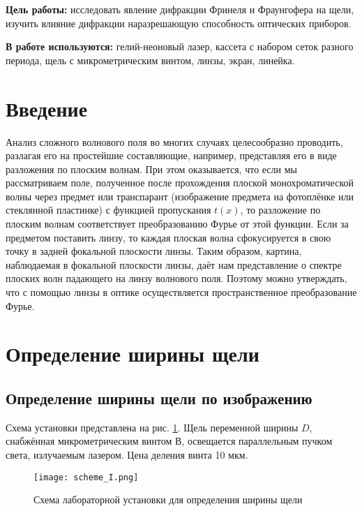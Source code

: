 


    

    \textbf{Цель работы:} исследовать явление дифракции Фринеля и Фраунгофера на щели,
    изучить влияние дифракции наразрешающую способность оптических приборов.

    \textbf{В работе используются:} гелий-неоновый лазер, кассета с набором
    сеток разного периода, щель с микрометрическим винтом, линзы,
    экран, линейка.

    \section{Введение}

    Анализ сложного волнового поля во многих случаях целесообразно проводить, разлагая его на простейшие составляющие, например,
    представляя его в виде разложения по плоским волнам. При этом оказывается, что если мы рассматриваем поле, полученное после прохождения плоской монохроматической волны через предмет или транспарант (изображение предмета на фотоплёнке или стеклянной пластинке)
    с функцией пропускания $t(x)$, то разложение по плоским волнам соответствует преобразованию Фурье от этой функции. Если за предметом
    поставить линзу, то каждая плоская волна сфокусируется в свою точку
    в задней фокальной плоскости линзы. Таким образом, картина, наблюдаемая в фокальной плоскости линзы, даёт нам представление о спектре плоских волн падающего на линзу волнового поля. Поэтому можно
    утверждать, что с помощью линзы в оптике осуществляется пространственное преобразование Фурье.

    \section{Определение ширины щели}
    \subsection{Определение ширины щели по изображению}
    Схема установки представлена на рис. \ref{fig:scheme_I}. Щель переменной ширины $D$, снабжённая микрометрическим винтом $В$, освещается параллельным пучком света, излучаемым лазером. Цена деления винта 10 мкм.
    
    \begin{figure}[h!]
    	\centering
    	\texttt{[image: scheme\_I.png]}
    	\caption{Схема лабораторной установки для определения ширины щели}
    	\label{fig:scheme_I}
    \end{figure}

